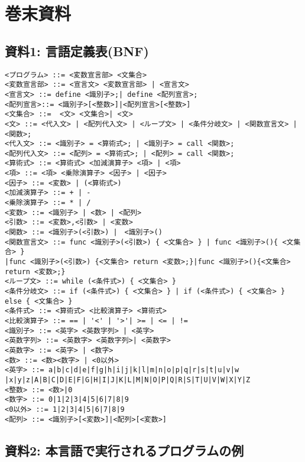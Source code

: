 \documentclass[11pt,a4j]{jarticle}
\begin{document}
\section{巻末資料}

\subsection{資料1: 言語定義表(BNF)}

{\baselineskip 2mm
\begin{verbatim}
<プログラム> ::= <変数宣言部> <文集合>
<変数宣言部> ::= <宣言文> <変数宣言部> | <宣言文>
<宣言文> ::= define <識別子>;| define <配列宣言>;
<配列宣言>::= <識別子>[<整数>]|<配列宣言>[<整数>]
<文集合> ::=  <文> <文集合>| <文>
<文> ::= <代入文> | <配列代入文> | <ループ文> | <条件分岐文> | <関数宣言文> | <関数>;
<代入文> ::= <識別子> = <算術式>; | <識別子> = call <関数>; 
<配列代入文> ::= <配列> = <算術式>; | <配列> = call <関数>;
<算術式> ::= <算術式> <加減演算子> <項> | <項>
<項> ::= <項> <乗除演算子> <因子> | <因子>
<因子> ::= <変数> | (<算術式>)
<加減演算子> ::= + | -
<乗除演算子> ::= * | /
<変数> ::= <識別子> | <数> | <配列>
<引数> ::= <変数>,<引数> | <変数>
<関数> ::= <識別子>(<引数>) |　<識別子>()
<関数宣言文> ::= func <識別子>(<引数>) { <文集合> } | func <識別子>(){ <文集合> }
|func <識別子>(<引数>) {<文集合> return <変数>;}|func <識別子>(){<文集合> return <変数>;}
<ループ文> ::= while (<条件式>) { <文集合> }
<条件分岐文> ::= if (<条件式>) { <文集合> } | if (<条件式>) { <文集合> } else { <文集合> }
<条件式> ::= <算術式> <比較演算子> <算術式>
<比較演算子> ::= == | '<' | '>'| >= | <= | !=
<識別子> ::= <英字> <英数字列> | <英字>
<英数字列> ::= <英数字> <英数字列>| <英数字>
<英数字> ::= <英字> | <数字>
<数> ::= <数><数字> | <0以外>
<英字> ::= a|b|c|d|e|f|g|h|i|j|k|l|m|n|o|p|q|r|s|t|u|v|w
|x|y|z|A|B|C|D|E|F|G|H|I|J|K|L|M|N|O|P|Q|R|S|T|U|V|W|X|Y|Z
<整数> ::= <数>|0
<数字> ::= 0|1|2|3|4|5|6|7|8|9
<0以外> ::= 1|2|3|4|5|6|7|8|9
<配列> ::= <識別子>[<変数>]|<配列>[<変数>]
\end{verbatim}}


\subsection{資料2: 本言語で実行されるプログラムの例}






% 
% 
\end{document}
